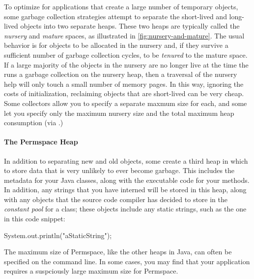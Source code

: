 To optimize for applications that create a large number of temporary objects,
some garbage collection strategies attempt to separate the short-lived and
long-lived objects into two separate heaps. These two heaps are typically called
the \emph{nursery} and \emph{mature} spaces, as illustrated in
\autoref{fig:nursery-and-mature}. The usual behavior is for objects to be
allocated in the nursery and, if they survive a sufficient number of garbage
collection cycles, to be \emph{tenured} to the mature space. If a large majority
of the objects in the nursery are no longer live at the time the \jre runs a
garbage collection on the nursery heap, then a traversal of the nursery help will
only touch a small number of memory pages. In this way, ignoring the costs of
initialization, reclaiming objects that are short-lived can be very cheap. Some
collectors allow you to specify a separate maxmum size for each, and some let you
specify only the maximum nursery size and the total maximum heap consumption (via
.)

\paragraph{The Permspace Heap}
In addition to separating new and old objects, some \jres create
a third heap in which to store data that is very unlikely to ever become
garbage. This includes the \jres metadata for your Java classes, along with the
executable code for your methods. In addition, any strings that you have
interned will be stored in this heap, along with any objects that the source
code compiler has decided to store in the \emph{constant pool} for a class;
these objects include any static strings, such as the one in this code snippet:

\begin{shortlisting}
System.out.println("aStaticString");
\end{shortlisting} 

The maximum size of Permspace, like the other heaps in Java, can often be
specified on the command line. In some cases, you may find that your application
requires a suspciously large maximum size for Permspace.
 
